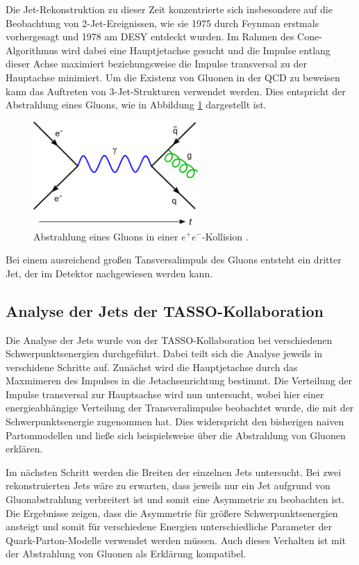 Die Jet-Rekonstruktion zu dieser Zeit konzentrierte sich insbesondere auf die Beobachtung von 2-Jet-Ereignissen, wie sie 1975 durch Feynman erstmals vorhergesagt und 1978 am DESY entdeckt wurden.
Im Rahmen des Cone-Algorithmus wird dabei eine Hauptjetachse gesucht und die Impulse entlang dieser Achse maximiert beziehungsweise die Impulse transversal zu der Hauptachse minimiert.
Um die Existenz von Gluonen in der QCD zu beweisen kann das Auftreten von 3-Jet-Strukturen verwendet werden.
Dies entspricht der Abstrahlung eines Gluons, wie in Abbildung \ref{fig:gluon} dargestellt ist.
\begin{figure}
  \centering
  \includegraphics[height=4.0cm]{ressources/gluon.png}
  \caption{Abstrahlung eines Gluons in einer $e^+ e^-$-Kollision \cite{gluon}.}
  \label{fig:gluon}
\end{figure}
Bei einem ausreichend großen Tansversalimpuls des Gluons entsteht ein dritter Jet, der im Detektor nachgewiesen werden kann.

\subsection{Analyse der Jets der TASSO-Kollaboration}
Die Analyse der Jets wurde von der TASSO-Kollaboration bei verschiedenen Schwerpunktsenergien durchgeführt. 
Dabei teilt sich die Analyse jeweils in verschidene Schritte auf.
Zunächst wird die Hauptjetachse durch das Maxmimeren des Impulses in die Jetachsenrichtung bestimmt.
Die Verteilung der Impulse transversal zur Hauptsachse wird nun untersucht, wobei hier einer energieabhängige Verteilung der Transveralimpulse beobachtet wurde, die mit der Schwerpunktsenergie zugenommen hat. 
Dies widerspricht den bisherigen naiven Partonmodellen und ließe sich beispielsweise über die Abstrahlung von Gluonen erklären.

Im nächsten Schritt werden die Breiten der einzelnen Jets untersucht.
Bei zwei rekonstruierten Jets wäre zu erwarten, dass jeweils nur ein Jet aufgrund von Gluonabstrahlung verbreitert ist und somit eine Asymmetrie zu beobachten ist.
Die Ergebnisse zeigen, dass die Asymmetrie für größere Schwerpunktsenergien ansteigt und somit für verschiedene Energien unterschiedliche Parameter der Quark-Parton-Modelle verwendet werden müssen.
Auch dieses Verhalten ist mit der Abstrahlung von Gluonen als Erklärung kompatibel.

